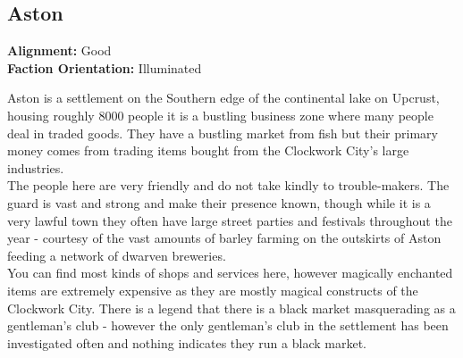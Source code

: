 \documentclass[10pt,twoside,twocolumn]{article}
\begin{document}
\subsection{Aston}
\textbf{Alignment:} Good \\
\textbf{Faction Orientation:} Illuminated\\
\begin{quotebox}
	Aston is a settlement on the Southern edge of the continental lake on Upcrust, housing roughly 8000 people it is a bustling business zone where many people deal in traded goods. They have a bustling market from fish but their primary money comes from trading items bought from the Clockwork City's large industries.\\

	The people here are very friendly and do not take kindly to trouble-makers. The guard is vast and strong and make their presence known, though while it is a very lawful town they often have large street parties and festivals throughout the year - courtesy of the vast amounts of barley farming on the outskirts of Aston feeding a network of dwarven breweries.\\

	You can find most kinds of shops and services here, however magically enchanted items are extremely expensive as they are mostly magical constructs of the Clockwork City. There is a legend that there is a black market masquerading as a gentleman's club - however the only gentleman's club in the settlement has been investigated often and nothing indicates they run a black market.
\end{quotebox}
\end{document}
